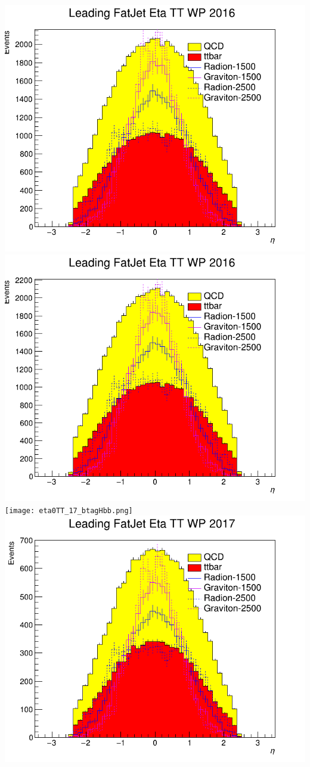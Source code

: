 \includegraphics[width=1\textwidth]{eta0TT_16_btagHbb.png}
\includegraphics[width=1\textwidth]{eta0TT_16_deepTagMD_HbbvsQCD.png}
\texttt{[image: eta0TT\_17\_btagHbb.png]}
\includegraphics[width=1\textwidth]{eta0TT_17_deepTagMD_HbbvsQCD.png}
